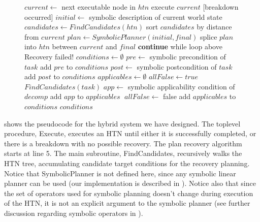 \documentclass{llncs}
\begin{document}
\begin{figure}[t]
  
  \begin{algorithmic}[1]\small
    
       \State $current\gets$ next executable node in $htn$
        execute $current$
       \Else\hskip 0.1in [breakdown occurred]
         \State $initial\gets$ symbolic description of current world state
         \State $candidates\gets FindCandidates(htn)$
         \State sort $candidates$ by distance from $current$
           \State $plan\gets SymbolicPlanner(initial,final)$
             \State splice $plan$ into $htn$ between $current$ and $final$
             \State \textbf{continue} while loop above
           \EndIf
         \EndFor
         \State Recovery failed!
        \EndIf
      \EndWhile
    \EndProcedure
\Statex
      \State $conditions\gets\emptyset$
      \State $pre\gets$ symbolic precondition of $task$
        \State add $pre$ to $conditions$\EndIf
      \State $post\gets$ symbolic postcondition of $task$
        \State add $post$ to $conditions$
      \EndIf
      \State $applicables\gets\emptyset$
      \State $allFalse\gets true$
         $FindCandidates(task)$
        \EndFor 
             \State $app\gets$ symbolic applicability condition of $decomp$
              add $app$ to $applicables$\EndIf
          \Else $\;allFalse\gets$ false
          \EndIf 
        \EndIf
      \EndFor
       add $applicables$ to $conditions$
      \EndIf
      \State\Return $conditions$
    \EndProcedure 
    
  \end{algorithmic}
  \vskip 8pt
\end{figure} 

 shows the pseudocode for the hybrid system we
have designed.  The toplevel procedure, {\sc Execute}, executes an
HTN until either it is successfully completed, or there is a breakdown
with no possible recovery.  The plan recovery algorithm starts at line
5.  The main subroutine, {\sc FindCandidates}, recursively walks the
HTN tree, accumulating candidate target conditions for the
recovery planning.  Notice that {\sc SymbolicPlanner} is not defined
here, since any symbolic linear planner can be used (our
implementation is described in ).  Notice also that
since the set of operators used for symbolic planning doesn't change
during execution of the HTN, it is not an explicit argument to the
symbolic planner (see further discussion regarding symbolic operators
in ).
\end{document}
